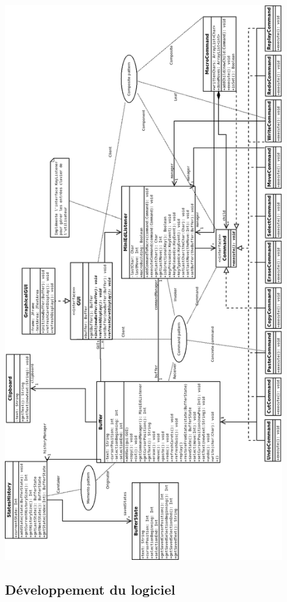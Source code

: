 \documentclass[a4paper]{article}
\begin{document}
	\begin{center}
		\includegraphics[width=0.9\textwidth]{UML.png}~
	\end{center}

	\newpage
	


	\begin{center}
		\section{Développement du logiciel}
	\end{center}
\end{document}
